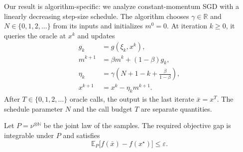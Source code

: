 \documentclass[10pt]{article}
\theoremstyle{definition}
\begin{document}
Our result is algorithm-specific: we analyze constant-momentum SGD with a linearly decreasing step-size schedule. The algorithm chooses $\gamma\in\mathbb{R}$ and $N\in\{0,1,2,\ldots\}$ from its inputs and initializes $m^0=0$. At iteration $k\geq0$, it queries the oracle at $x^k$ and updates
\[
\begin{aligned}
g_k&=g(\xi_k,x^k),\\
m^{k+1}&=\beta m^k+(1-\beta)g_k,\\
\eta_k&=\gamma\left(N+1-k+\frac{\beta}{1-\beta}\right),\\
x^{k+1}&=x^k-\eta_k m^{k+1}.
\end{aligned}
\]
After $T\in\{0,1,2,\ldots\}$ oracle calls, the output is the last iterate $\bar{x}=x^T$. The schedule parameter $N$ and the call budget $T$ are separate quantities.

Let $P=\nu^{\otimes\mathbb{N}}$ be the joint law of the samples. The required objective gap is integrable under $P$ and satisfies
\[
\mathbb{E}_{P}\bigl[f(\bar{x})-f(x^\star)\bigr]\leq\varepsilon.
\]
\end{document}
